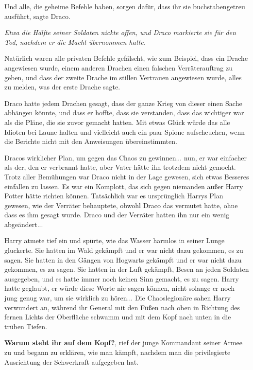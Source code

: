 \glqq Und alle, die geheime Befehle haben, sorgen dafür, dass ihr sie
buchstabengetreu ausführt\grqq{}, sagte Draco.

\emph{ Etwa die Hälfte seiner Soldaten nickte offen, und Draco markierte sie für den Tod, nachdem er die Macht übernommen hatte.}

Natürlich waren alle privaten Befehle gefälscht, wie zum Beispiel, dass ein
Drache angewiesen wurde, einem anderen Drachen einen falschen Verräterauftrag zu
geben, und dass der zweite Drache im stillen Vertrauen angewiesen wurde, alles
zu melden, was der erste Drache sagte.

Draco hatte jedem Drachen gesagt, dass der ganze Krieg von dieser einen Sache
abhängen könnte, und dass er hoffte, dass sie verstanden, dass das wichtiger war
als die Pläne, die sie zuvor gemacht hatten. Mit etwas Glück würde das alle
Idioten bei Laune halten und vielleicht auch ein paar Spione aufscheuchen, wenn
die Berichte nicht mit den Anweisungen übereinstimmten.

Dracos wirklicher Plan, um gegen das Chaos zu gewinnen... nun, er war einfacher
als der, den er verbrannt hatte, aber Vater hätte ihn trotzdem nicht gemocht.
Trotz aller Bemühungen war Draco nicht in der Lage gewesen, sich etwas Besseres
einfallen zu lassen. Es war ein Komplott, das sich gegen niemanden außer Harry
Potter hätte richten können. Tatsächlich war es ursprünglich Harrys Plan
gewesen, wie der Verräter behauptete, obwohl Draco das vermutet hatte, ohne dass
es ihm gesagt wurde. Draco und der Verräter hatten ihn nur ein wenig
abgeändert...


Harry atmete tief ein und spürte, wie das Wasser harmlos in seiner Lunge
gluckerte. Sie hatten im Wald gekämpft und er war nicht dazu gekommen, es zu
sagen. Sie hatten in den Gängen von Hogwarts gekämpft und er war nicht dazu
gekommen, es zu sagen. Sie hatten in der Luft gekämpft, Besen an jeden Soldaten
ausgegeben, und es hatte immer noch keinen Sinn gemacht, es zu sagen. Harry
hatte geglaubt, er würde diese Worte nie sagen können, nicht solange er noch
jung genug war, um sie wirklich zu hören... Die Chaoslegionäre sahen Harry
verwundert an, während ihr General mit den Füßen nach oben in Richtung des
fernen Lichts der Oberfläche schwamm und mit dem Kopf nach unten in die trüben
Tiefen.

\glqq \textbf{Warum steht ihr auf dem Kopf?}\grqq{}, rief der junge Kommandant
seiner Armee zu und begann zu erklären, wie man kämpft, nachdem man die
privilegierte Ausrichtung der Schwerkraft aufgegeben hat.

